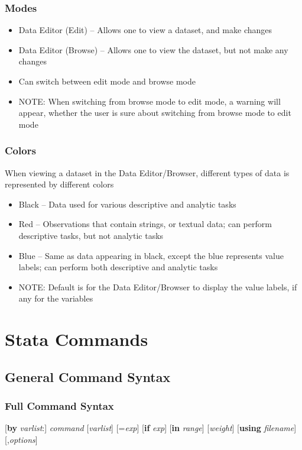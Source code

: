 \documentclass{beamer}
\begin{document}
\begin{frame}
	\frametitle{Modes}
		\begin{itemize}
			\item Data Editor (Edit) -- Allows one to view a dataset, and make changes
			\item Data Editor (Browse) -- Allows one to view the dataset, but not make any changes
			\item Can switch between edit mode and browse mode
			\item NOTE: When switching from browse mode to edit mode, a warning will appear, whether the user is sure about switching from browse mode to edit mode
		\end{itemize}
\end{frame}

\begin{frame}
	\frametitle{Colors}
		When viewing a dataset in the Data Editor/Browser, different types of data is represented by different colors
		\begin{itemize}
			\item Black -- Data used for various descriptive and analytic tasks
			\item Red -- Observations that contain strings, or textual data; can perform descriptive tasks, but not analytic tasks
			\item Blue -- Same as data appearing in black, except the blue represents value labels; can perform both descriptive and analytic tasks
			\item NOTE: Default is for the Data Editor/Browser to display the value labels, if any for the variables
		\end{itemize}
\end{frame}

\section{Stata Commands}
\subsection{General Command Syntax}

\begin{frame}
	\frametitle{Full Command Syntax}
		{\tiny [\textbf{by} \textit{varlist}:] \textit{command} [\textit{varlist}] [=\textit{exp}] [\textbf{if} \textit{exp}] [\textbf{in} \textit{range}] [\textit{weight}] [\textbf{using} \textit{filename}] [,\textit{options}]}
\end{frame}
\end{document}
